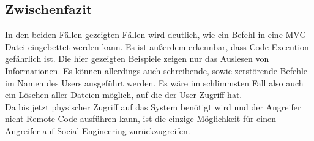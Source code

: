 
\subsection{Zwischenfazit}\label{subsec:zwischenfazit}

In den beiden Fällen gezeigten Fällen wird deutlich, wie ein Befehl in eine MVG-Datei eingebettet werden kann.
Es ist außerdem erkennbar, dass Code-Execution gefährlich ist.
Die hier gezeigten Beispiele zeigen nur das Auslesen von Informationen.
Es können allerdings auch schreibende, sowie zerstörende Befehle im Namen des Users ausgeführt werden.
Es wäre im schlimmsten Fall also auch ein Löschen aller Dateien möglich, auf die der User Zugriff hat.
\\
Da bis jetzt physischer Zugriff auf das System benötigt wird und der Angreifer nicht Remote Code ausführen kann,
ist die einzige Möglichkeit für einen Angreifer auf Social Engineering zurückzugreifen.\\